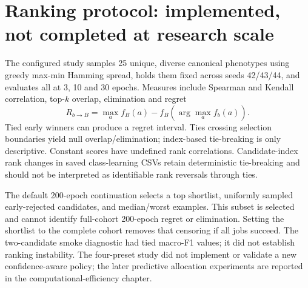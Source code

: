 \documentclass[11pt,a4paper]{report}
\begin{document}
\section{Ranking protocol: implemented, not completed at research scale}
The configured study samples 25 unique, diverse canonical phenotypes using greedy max-min Hamming spread, holds them fixed across seeds 42/43/44, and evaluates all at 3, 10 and 30 epochs. Measures include Spearman and Kendall correlation, top-$k$ overlap, elimination and regret
\begin{equation}R_{b\to B}=\max_a f_B(a)-f_B(\arg\max_a f_b(a)).\end{equation}
Tied early winners can produce a regret interval. Ties crossing selection boundaries yield null overlap/elimination; index-based tie-breaking is only descriptive. Constant scores have undefined rank correlations. Candidate-index rank changes in saved class-learning CSVs retain deterministic tie-breaking and should not be interpreted as identifiable rank reversals through ties.

The default 200-epoch continuation selects a top shortlist, uniformly sampled early-rejected candidates, and median/worst examples. This subset is selected and cannot identify full-cohort 200-epoch regret or elimination. Setting the shortlist to the complete cohort removes that censoring if all jobs succeed. The two-candidate smoke diagnostic had tied macro-F1 values; it did not establish ranking instability. The four-preset study did not implement or validate a new confidence-aware policy; the later predictive allocation experiments are reported in the computational-efficiency chapter.
\end{document}
